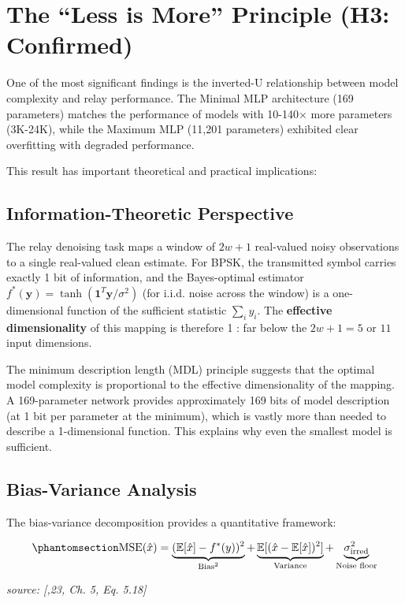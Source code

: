 \section{The ``Less is More'' Principle (H3: Confirmed)}\label{sec:the-less-is-more-principle-h3-confirmed}

One of the most significant findings is the inverted-U relationship between model complexity and relay performance. The Minimal MLP architecture (169 parameters) matches the performance of models with 10-140× more parameters (3K-24K), while the Maximum MLP (11,201 parameters) exhibited clear overfitting with degraded performance.

This result has important theoretical and practical implications:

\subsection{Information-Theoretic Perspective}\label{sec:information-theoretic-perspective}

The relay denoising task maps a window of \(2w+1\) real-valued noisy observations to a single real-valued clean estimate. For BPSK, the transmitted symbol carries exactly 1 bit of information, and the Bayes-optimal estimator \(f^*(\mathbf{y}) = \tanh(\mathbf{1}^T \mathbf{y} / \sigma^2)\) (for i.i.d. noise across the window) is a one-dimensional function of the sufficient statistic \(\sum_i y_i\). The \textbf{effective dimensionality} of this mapping is therefore 1 : far below the \(2w+1 = 5\) or \(11\) input dimensions.

The minimum description length (MDL) principle suggests that the optimal model complexity is proportional to the effective dimensionality of the mapping. A 169-parameter network provides approximately 169 bits of model description (at 1 bit per parameter at the minimum), which is vastly more than needed to describe a 1-dimensional function. This explains why even the smallest model is sufficient.

\subsection{Bias-Variance Analysis}\label{sec:bias-variance-analysis}

The bias-variance decomposition provides a quantitative framework:

\begin{equation}\protect\phantomsection\label{eq:bias-variance-relay}{\text{MSE}(\hat{x}) = \underbrace{(\mathbb{E}[\hat{x}] - f^*(y))^2}_{\text{Bias}^2} + \underbrace{\mathbb{E}[(\hat{x} - \mathbb{E}[\hat{x}])^2]}_{\text{Variance}} + \underbrace{\sigma^2_{\text{irred}}}_{\text{Noise floor}}
}\end{equation} \par{\small\textit{source: [\cite{He2015DelvingRectifiers},23, Ch. 5, Eq. 5.18]}}

